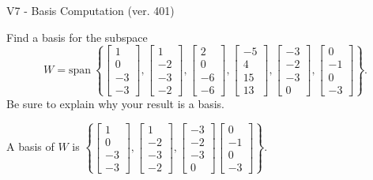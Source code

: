 \begin{exercise}
  \begin{exerciseTitle}V7 - Basis Computation (ver. 401)\end{exerciseTitle}
  \begin{exerciseStatement}
    Find a basis for the subspace 
\[W=\mathrm{span}\ \left\{\left[\begin{array}{r}
1 \\
0 \\
-3 \\
-3
\end{array}\right] , \left[\begin{array}{r}
1 \\
-2 \\
-3 \\
-2
\end{array}\right] , \left[\begin{array}{r}
2 \\
0 \\
-6 \\
-6
\end{array}\right] , \left[\begin{array}{r}
-5 \\
4 \\
15 \\
13
\end{array}\right] , \left[\begin{array}{r}
-3 \\
-2 \\
-3 \\
0
\end{array}\right] , \left[\begin{array}{r}
0 \\
-1 \\
0 \\
-3
\end{array}\right]\right\}.\]
 Be sure to explain why your result is a basis.


  \end{exerciseStatement}
  \begin{exerciseAnswer}
   A basis of \(W\) is  \(\left\{\left[\begin{array}{r}
1 \\
0 \\
-3 \\
-3
\end{array}\right] , \left[\begin{array}{r}
1 \\
-2 \\
-3 \\
-2
\end{array}\right] , \left[\begin{array}{r}
-3 \\
-2 \\
-3 \\
0
\end{array}\right] \left[\begin{array}{r}
0 \\
-1 \\
0 \\
-3
\end{array}\right]\right\}\).
  


  \end{exerciseAnswer}
\end{exercise}